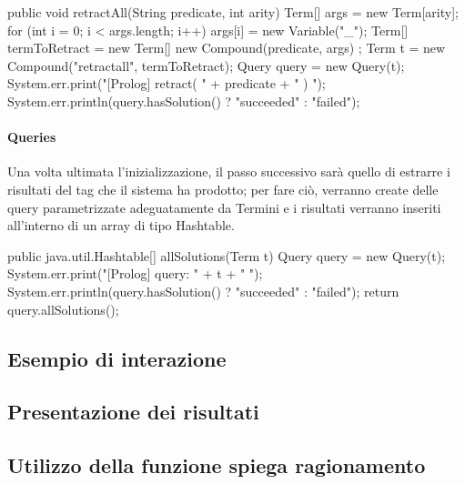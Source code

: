 \begin{javacode} 
 public void retractAll(String predicate, int arity) {  
   Term[] args = new Term[arity];
   for (int i = 0; i < args.length; i++)
       args[i] = new Variable("_");
   Term[] termToRetract = new Term[]{ new Compound(predicate, args) };    
   Term t = new Compound("retractall", termToRetract);
   Query query = new Query(t);
   System.err.print("[Prolog] retract( " + predicate + " ) ");
   System.err.println(query.hasSolution() ? "succeeded" : "failed");
 }
\end{javacode}

\paragraph{Queries}
Una volta ultimata l'inizializzazione, il passo successivo sarà quello di estrarre i risultati del tag che il sistema ha prodotto; per fare ciò, verranno create delle query parametrizzate adeguatamente da Termini e i risultati verranno inseriti all'interno di un array di tipo Hashtable.

\begin{javacode}
 public java.util.Hashtable[] allSolutions(Term t) {
   Query query = new Query(t);
   System.err.print("[Prolog] query: " + t + " ");
   System.err.println(query.hasSolution() ? "succeeded" : "failed");
   return query.allSolutions();
 }
\end{javacode}

\subsection{Esempio di interazione}

\subsection{Presentazione dei risultati}

\subsection{Utilizzo della funzione spiega ragionamento}
